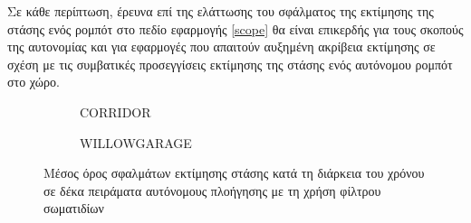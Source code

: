 Σε κάθε περίπτωση, έρευνα επί της ελάττωσης του σφάλματος της εκτίμησης της
στάσης ενός ρομπότ στο πεδίο εφαρμογής \ref{scope} θα είναι επικερδής για τους
σκοπούς της αυτονομίας και για εφαρμογές που απαιτούν αυξημένη ακρίβεια
εκτίμησης σε σχέση με τις συμβατικές προσεγγίσεις εκτίμησης της στάσης ενός
αυτόνομου ρομπότ στο χώρο.

\begin{figure}[h]\vspace{1cm}\centering
   \begin{subfigure}{0.49\linewidth}\centering
     
     \vspace{0.75cm}
     \caption{\small CORRIDOR}
   \end{subfigure}
   \begin{subfigure}{0.49\linewidth} \centering
     
     \vspace{0.75cm}
     \caption{\small WILLOWGARAGE}
   \end{subfigure}
\caption{\small Μέσος όρος σφαλμάτων εκτίμησης στάσης κατά τη διάρκεια του
         χρόνου σε δέκα πειράματα αυτόνομους πλοήγησης με τη χρήση φίλτρου
         σωματιδίων}
\label{fig:02_01_05}
\end{figure}
